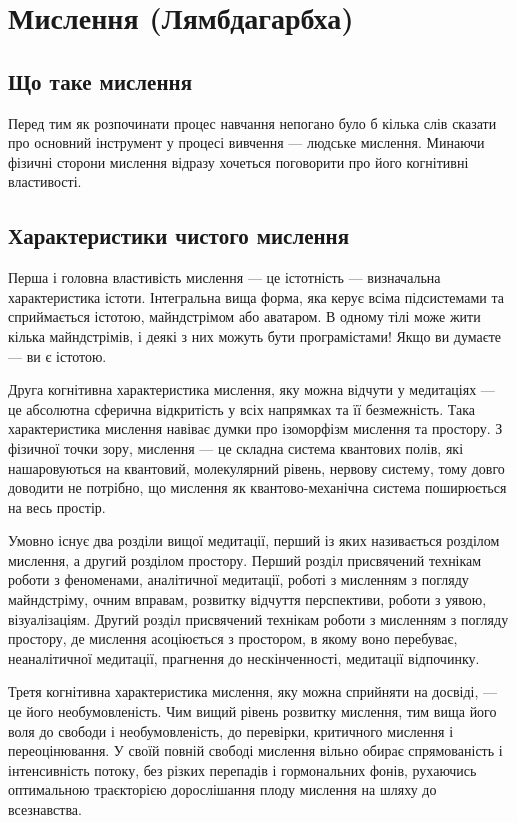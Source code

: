 \section{Мислення (Лямбдагарбха)}

\subsection{Що таке мислення}

Перед тим як розпочинати процес навчання непогано було
б кілька слів сказати про основний інструмент у процесі
вивчення --- людське мислення. Минаючи фізичні сторони
мислення відразу хочеться поговорити про його когнітивні властивості.

\subsection{Характеристики чистого мислення}

Перша і головна властивість мислення --- це істотність ---
визначальна характеристика істоти. Інтегральна вища форма,
яка керує всіма підсистемами та сприймається істотою,
майндстрімом або аватаром. В одному тілі може жити
кілька майндстрімів, і деякі з них можуть бути програмістами!
Якщо ви думаєте --- ви є істотою.

Друга когнітивна характеристика мислення, яку можна
відчути у медитаціях --- це абсолютна сферична відкритість
у всіх напрямках та її безмежність. Така характеристика
мислення навіває думки про ізоморфізм мислення та простору.
З фізичної точки зору, мислення --- це складна система квантових
полів, які нашаровуються на квантовий, молекулярний рівень,
нервову систему, тому довго доводити не потрібно, що
мислення як квантово-механічна система поширюється на весь простір.

Умовно існує два розділи вищої медитації, перший із яких
називається розділом мислення, а другий розділом простору.
Перший розділ присвячений технікам роботи з феноменами,
аналітичної медитації, роботі з мисленням з погляду
майндстріму, очним вправам, розвитку відчуття перспективи,
роботи з уявою, візуалізаціям. Другий розділ присвячений
технікам роботи з мисленням з погляду простору, де мислення
асоціюється з простором, в якому воно перебуває,
неаналітичної медитації, прагнення до нескінченності,
медитації відпочинку.

Третя когнітивна характеристика мислення, яку можна
сприйняти на досвіді, --- це його необумовленість.
Чим вищий рівень розвитку мислення, тим вища його
воля до свободи і необумовленість, до перевірки,
критичного мислення і переоцінювання. У своїй повній
свободі мислення вільно обирає спрямованість і інтенсивність
потоку, без різких перепадів і гормональних фонів,
рухаючись оптимальною траєкторією дорослішання плоду
мислення на шляху до всезнавства.

